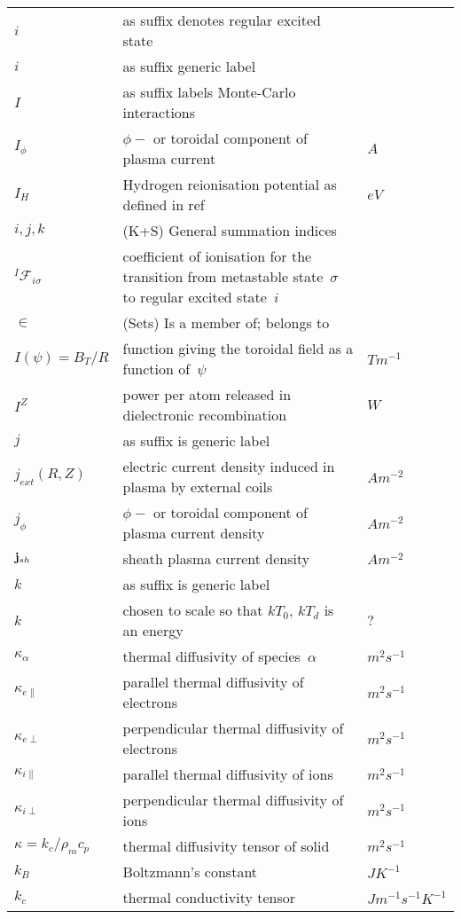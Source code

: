 \begin{longtable}{|p{3.0cm}|p{10.0cm}|p{3.0cm}|}
$i$ & as suffix denotes regular excited state & \\
$i$ & as suffix generic label & \\
$I$ & as suffix labels Monte-Carlo interactions & \\
$I_\phi$ & $\phi-$ or toroidal component of plasma current & $A$ \\
$I_H$ & Hydrogen reionisation potential as defined in ref~\cite{Ha13Benc} & $eV$ \\
$i,j,k$ &  (K+S) General summation indices & \\
$^I\mathcal{F}_{i\sigma}$ & coefficient of ionisation for the transition from metastable state~$\sigma$ to regular excited state~$i$ & \\
$\in$ &  (Sets) Is a member of; belongs to & \\
$I(\psi)=B_T/R$ & function giving the toroidal field as a function of~$\psi$  & $T m^{-1}$ \\
$I^Z$ & power per atom released in dielectronic recombination  & $W$ \\
$j$ & as suffix is generic label & \\
$j_{ext}(R,Z)$ & electric current density induced in plasma by external coils  & $A m^{-2}$ \\
$j_\phi$ & $\phi-$ or toroidal component of plasma current density  & $A m^{-2}$ \\
${\bf j}_{sh}$ & sheath plasma current density  & $A m^{-2}$ \\
$k$ & as suffix is generic label & \\
$k$ & chosen to scale so that $kT_0$, $kT_d$ is an energy & $?$ \\
$\kappa_\alpha$ & thermal diffusivity of species~$\alpha$ & $m^2 s^{-1}$ \\
$\kappa_{e\|}$ & parallel thermal diffusivity of electrons & $m^2 s^{-1}$ \\
$\kappa_{e\perp}$ & perpendicular thermal diffusivity of electrons & $m^2 s^{-1}$ \\
$\kappa_{i\|}$ & parallel thermal diffusivity of ions & $m^2 s^{-1}$ \\
$\kappa_{i\perp}$ & perpendicular thermal diffusivity of ions & $m^2 s^{-1}$ \\
$\kappa=k_c/\rho_m c_p$ & thermal diffusivity tensor of solid & $m^2 s^{-1}$ \\
$k_B$ & Boltzmann's constant  & $J K^{-1}$ \\
$k_c$ & thermal conductivity tensor  & $J m^{-1} s^{-1} K^{-1}$ \\

\end{longtable}
